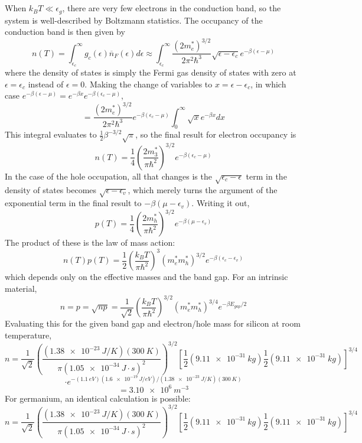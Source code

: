 \documentclass{article}
\begin{document}
\section{}
When $k_{B}T\ll \epsilon_{g} $, there are very few electrons in the conduction band, so the system is well-described by Boltzmann statistics.
The occupancy of the conduction band is then given by
\[
  n(T)=\int_{\epsilon_{c}}^{\infty}g_{c}(\epsilon)\overline{n}_{F}(\epsilon)d\epsilon
  \approx \int_{\epsilon_{c}}^{\infty}\frac{(2m_{e}^{*})^{3/2}}{2\pi^{2}\hbar^{3}}\sqrt{\epsilon-\epsilon_{c}}e^{-\beta(\epsilon-\mu)}
\]
where the density of states is simply the Fermi gas density of states with zero at $\epsilon=\epsilon_{c}$ instead of $\epsilon=0$.
Making the change of variables to $x=\epsilon-\epsilon_{c}$, in which case $e^{-\beta(\epsilon-\mu)}=e^{-\beta x}e^{-\beta(\epsilon_{c}-\mu)}$,
\[
  =\frac{(2m_{e}^{*})^{3/2}}{2\pi^{2}\hbar^{3}}e^{-\beta(\epsilon_{c}-\mu)}\int_{0}^{\infty}\sqrt{x}e^{-\beta x}dx
\]
This integral evaluates to $\frac{1}{2}\beta^{-3/2}\sqrt{\pi}$, so the final result for electron occupancy is
\[
  n(T)=\frac{1}{4}\left( \frac{{2m_{3}^{*}}}{\pi \hbar^{2}} \right)^{3/2}e^{-\beta(\epsilon_{c}-\mu)}
\]
In the case of the hole occupation, all that changes is the $\sqrt{\epsilon_{c}-\epsilon}$ term in the density of states becomes
$\sqrt{\epsilon-\epsilon_{v}}$, which merely turns the argument of the exponential term in the final result to $-\beta(\mu-\epsilon_{v})$.
Writing it out,
\[
  p(T)=\frac{1}{4}\left( \frac{2m_{h}^{*}}{\pi\hbar^{2}} \right)^{3/2}e^{-\beta(\mu-\epsilon_{v})}
\]
The product of these is the law of mass action:
\[
  n(T)p(T)=\frac{1}{2}\left( \frac{k_{B}T}{\pi\hbar^{2}} \right)^{3}(m_{e}^{*}m_{h}^{*})^{3/2}e^{-\beta(\epsilon_{c}-\epsilon_{v})}
\]
which depends only on the effective masses and the band gap.
For an intrinsic material,
\[
  n=p=\sqrt{np}=\frac{1}{\sqrt{2}}\left( \frac{k_{B}T}{\pi\hbar^{2}} \right)^{3/2}(m_{e}^{*}m_{h}^{*})^{3/4}e^{-\beta E_{gap}/2}
\]
Evaluating this for the given band gap and electron/hole mass for silicon at room temperature,
\[
  n=\frac{1}{\sqrt{2}}\left( \frac{(\SI{1.38e-23}{J/K})(\SI{300}{K})}{\pi(\SI{1.05e-34}{J\cdot s})^{2}} \right)^{3/2}
  [\frac{1}{2}(\SI{9.11e-31}{kg})\frac{1}{2}(\SI{9.11e-31}{kg})]^{3/4}
\]
\[
  \cdot e^{-(\SI{1.1}{eV})(\SI{1.6e-19}{J/eV})/(\SI{1.38e-23}{J/K})(\SI{300}{K})}
\]
\[
  =\SI{3.10e6}{m^{-3}}
\]
For germanium, an identical calculation is possible:
\[
  n=\frac{1}{\sqrt{2}}\left( \frac{(\SI{1.38e-23}{J/K})(\SI{300}{K})}{\pi(\SI{1.05e-34}{J\cdot s})^{2}} \right)^{3/2}
  [\frac{1}{2}(\SI{9.11e-31}{kg})\frac{1}{2}(\SI{9.11e-31}{kg})]^{3/4}
\]
\end{document}
